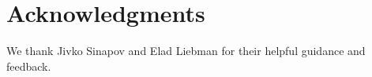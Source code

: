 \documentclass{article}
\begin{document}
        

    \section{Acknowledgments}
    
    We thank Jivko Sinapov and Elad Liebman for their helpful guidance and feedback.
	{}
	
\end{document}
